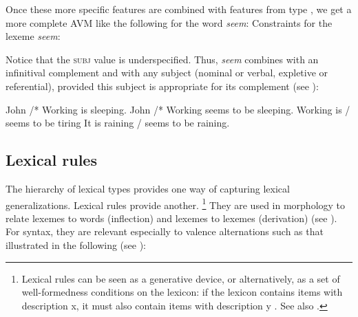 \documentclass[output=paper
	        ,collection
	        ,collectionchapter
 	        ,biblatex
                ,babelshorthands
                ,newtxmath
                ,draftmode
                ,colorlinks, citecolor=brown
]{langscibook}
\begin{document}
\noindent
Once these more specific features are combined with features from type , we get a
more complete AVM like the following for the word \emph{seem}:
\ea\label{ex:prop24}
Constraints for the lexeme \emph{seem}:\\
\z

\noindent
Notice that the \textsc{subj} value is underspecified. Thus, \emph{seem} combines with an infinitival complement and with any subject (nominal or verbal, expletive or referential), provided this subject is appropriate for its complement (see ):

\eal\label{ex:prop25}
\ex John /* Working is sleeping.
\ex John /* Working seems to be sleeping.
\ex Working is / seems to be tiring
\ex It is raining / seems to be raining.
\zl

\subsection{Lexical rules}\label{sec:prop4.2}
\label{prop:sec-lex-rules}

The hierarchy of lexical types provides one way of capturing lexical generalizations. Lexical rules provide another.%
%
\footnote{Lexical rules can be seen as a generative device, or alternatively, as a set of
  well-formedness conditions on the lexicon: if the lexicon contains items with description x, it
  must also contain items with description y \citep{Meurers2001a}. See also .}
%
They are used in morphology to relate lexemes to words (inflection) and lexemes to lexemes (derivation) (see \addpages). For syntax, they are relevant especially to valence alternations such as that illustrated in the following (see \addpages):
\end{document}
